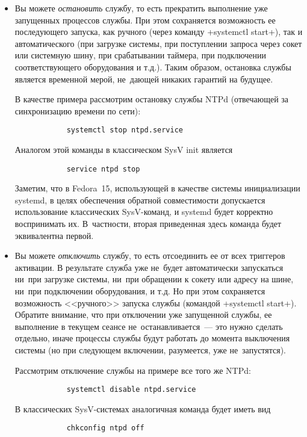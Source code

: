 \documentclass[10pt,oneside,a4paper]{article}
\begin{document}
\begin{itemize}
	\item Вы можете \emph{остановить} службу, то есть прекратить
		выполнение уже запущенных процессов службы. При этом
		сохраняется возможность ее последующего запуска, как ручного
		(через команду +systemctl start+), так и автоматического (при
		загрузке системы, при поступлении запроса через сокет или
		системную шину, при срабатывании таймера, при подключении
		соответствующего оборудования и т.д.).  Таким образом,
		остановка службы является временной мерой, не~дающей никаких
		гарантий на будущее.

		В качестве примера рассмотрим остановку службы NTPd
		(отвечающей за синхронизацию времени по сети):
		\begin{Verbatim}
			systemctl stop ntpd.service
		\end{Verbatim}

		Аналогом этой команды в классическом SysV init является
		\begin{Verbatim}
			service ntpd stop
		\end{Verbatim}

		Заметим, что в Fedora~15, использующей в качестве системы
		инициализации systemd, в целях обеспечения обратной
		совместимости допускается использование классических
		SysV-команд, и systemd будет корректно воспринимать их. 
		В~частности, вторая приведенная здесь команда будет эквивалентна
		первой.

	\item Вы можете \emph{отключить} службу, то есть отсоединить ее от всех
		триггеров активации. В результате служба уже не~будет
		автоматически запускаться ни~при загрузке системы, ни~при
		обращении к сокету или адресу на шине, ни~при подключении
		оборудования, и т.д. Но при этом сохраняется возможность
		<<ручного>> запуска службы (командой +systemctl start+).
		Обратите внимание, что при отключении уже запущенной службы, ее
		выполнение в текущем сеансе не~останавливается~--- это нужно
		сделать отдельно, иначе процессы службы будут работать до
		момента выключения системы (но при следующем включении,
		разумеется, уже не~запустятся).

		Рассмотрим отключение службы на примере все того же NTPd:
		\begin{Verbatim}
			systemctl disable ntpd.service
		\end{Verbatim}

		В классических SysV-системах аналогичная команда будет иметь
		вид
		\begin{Verbatim}
			chkconfig ntpd off
		\end{Verbatim}


\end{itemize}
\end{document}
